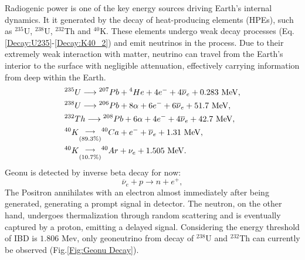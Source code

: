 			Radiogenic power is one of the key energy sources driving Earth's internal dynamics. It it generated by the decay of heat-producing elements (HPEs), such as ${}^{235}$U, $^{238}$U, ${}^{232}$Th and ${}^{40}$K. These elements undergo weak decay processes \cite{fiorentini2007geo} (Eq.\ref{Decay:U235}-\ref{Decay:K40_2}) and emit neutrinos in the process. Due to their extremely weak interaction with matter, neutrino can travel from the Earth's interior to the surface with negligible attenuation, effectively carrying information from deep within the Earth.
				\begin{align}
					&{}^{235}U \longrightarrow {}^{207}Pb + {}^{4}He + 4e^- + 4\overline{\nu}_e + 0.283 \text{ MeV},
					\label{Decay:U235}\\
					&{}^{238}U \longrightarrow {}^{206}Pb + 8\alpha + 6e^- + 6\overline{\nu}_e + 51.7 \text{ MeV},
					\label{Decay:U238}\\
					&{}^{232}Th \longrightarrow {}^{208}Pb + 6\alpha + 4e^- + 4\overline{\nu}_e + 42.7 \text{ MeV},
					\label{Decay:Th232}\\
					&{}^{40}K \overunderset{\longrightarrow}{(89.3\%)} {}^{40}Ca + e^- + \overline{\nu}_e + 1.31 \text{ MeV},
					\label{Decay:K40_1}\\
					&{}^{40}K \overunderset{\longrightarrow}{(10.7\%)} {}^{40}Ar + \nu_e + 1.505 \text{ MeV}.
					\label{Decay:K40_2}
				\end{align}
			Geonu is detected by inverse beta decay for now:
				\begin{equation}
					\overline{\nu}_e + p \longrightarrow n + e^+,
				\end{equation}
			The Positron annihilates with an electron almost immediately after being generated, generating a prompt signal in detector. The neutron, on the other hand, undergoes thermalization through random scattering and is eventually captured by a proton, emitting a delayed signal. Considering the energy threshold of IBD is $1.806$ Mev, only geoneutrino from decay of ${}^{238}$U and ${}^{232}$Th can currently be observed (Fig.\ref{Fig:Geonu Decay}).
